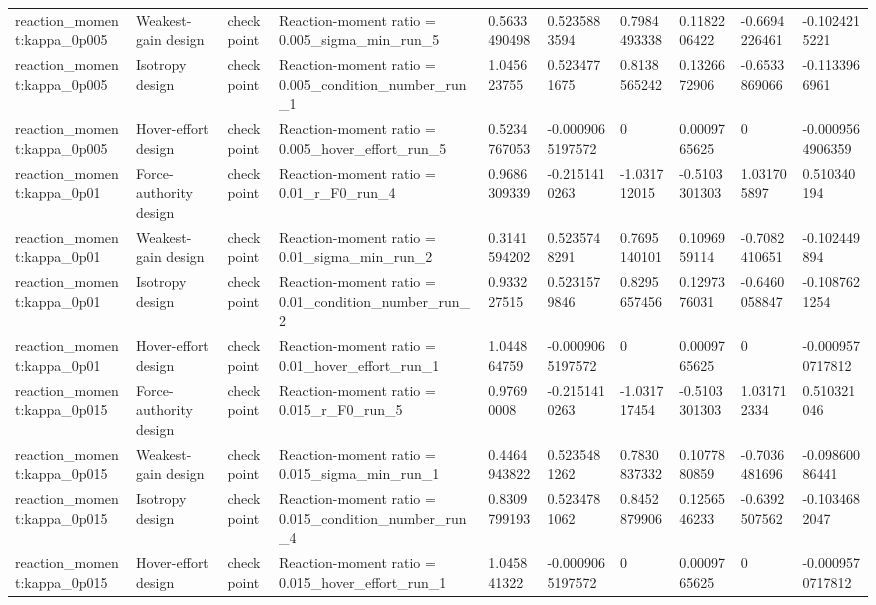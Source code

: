\begin{tabular}{@{}llllllllll@{}}
reaction\_moment:kappa\_0p005 & Weakest-gain design & checkpoint & Reaction-moment ratio = 0.005\_sigma\_min\_run\_5 & 0.5633490498 & 0.5235883594 & 0.7984493338 & 0.1182206422 & -0.6694226461 & -0.1024215221 \\
reaction\_moment:kappa\_0p005 & Isotropy design & checkpoint & Reaction-moment ratio = 0.005\_condition\_number\_run\_1 & 1.045623755 & 0.5234771675 & 0.8138565242 & 0.1326672906 & -0.6533869066 & -0.1133966961 \\
reaction\_moment:kappa\_0p005 & Hover-effort design & checkpoint & Reaction-moment ratio = 0.005\_hover\_effort\_run\_5 & 0.5234767053 & -0.0009065197572 & 0 & 0.0009765625 & 0 & -0.0009564906359 \\
reaction\_moment:kappa\_0p01 & Force-authority design & checkpoint & Reaction-moment ratio = 0.01\_r\_F0\_run\_4 & 0.9686309339 & -0.2151410263 & -1.031712015 & -0.5103301303 & 1.031705897 & 0.510340194 \\
reaction\_moment:kappa\_0p01 & Weakest-gain design & checkpoint & Reaction-moment ratio = 0.01\_sigma\_min\_run\_2 & 0.3141594202 & 0.5235748291 & 0.7695140101 & 0.1096959114 & -0.7082410651 & -0.102449894 \\
reaction\_moment:kappa\_0p01 & Isotropy design & checkpoint & Reaction-moment ratio = 0.01\_condition\_number\_run\_2 & 0.933227515 & 0.5231579846 & 0.8295657456 & 0.1297376031 & -0.6460058847 & -0.1087621254 \\
reaction\_moment:kappa\_0p01 & Hover-effort design & checkpoint & Reaction-moment ratio = 0.01\_hover\_effort\_run\_1 & 1.044864759 & -0.0009065197572 & 0 & 0.0009765625 & 0 & -0.0009570717812 \\
reaction\_moment:kappa\_0p015 & Force-authority design & checkpoint & Reaction-moment ratio = 0.015\_r\_F0\_run\_5 & 0.97690008 & -0.2151410263 & -1.031717454 & -0.5103301303 & 1.031712334 & 0.510321046 \\
reaction\_moment:kappa\_0p015 & Weakest-gain design & checkpoint & Reaction-moment ratio = 0.015\_sigma\_min\_run\_1 & 0.4464943822 & 0.5235481262 & 0.7830837332 & 0.1077880859 & -0.7036481696 & -0.09860086441 \\
reaction\_moment:kappa\_0p015 & Isotropy design & checkpoint & Reaction-moment ratio = 0.015\_condition\_number\_run\_4 & 0.8309799193 & 0.5234781062 & 0.8452879906 & 0.1256546233 & -0.6392507562 & -0.1034682047 \\
reaction\_moment:kappa\_0p015 & Hover-effort design & checkpoint & Reaction-moment ratio = 0.015\_hover\_effort\_run\_1 & 1.045841322 & -0.0009065197572 & 0 & 0.0009765625 & 0 & -0.0009570717812 \\

\end{tabular}
